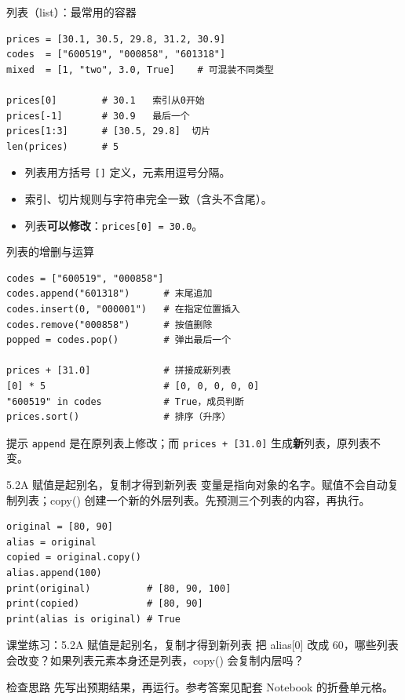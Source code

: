 \documentclass[9pt]{ctexbeamer}
\begin{document}
\begin{frame}[fragile]{列表（list）：最常用的容器}
	\begin{lstlisting}
prices = [30.1, 30.5, 29.8, 31.2, 30.9]
codes  = ["600519", "000858", "601318"]
mixed  = [1, "two", 3.0, True]    # 可混装不同类型

prices[0]        # 30.1   索引从0开始
prices[-1]       # 30.9   最后一个
prices[1:3]      # [30.5, 29.8]  切片
len(prices)      # 5
\end{lstlisting}
	\begin{itemize}
		\item 列表用方括号 \texttt{[]} 定义，元素用逗号分隔。
		\item 索引、切片规则与字符串完全一致（含头不含尾）。
		\item 列表\textbf{可以修改}：\texttt{prices[0] = 30.0}。
	\end{itemize}
\end{frame}

\begin{frame}[fragile]{列表的增删与运算}
	\begin{lstlisting}
codes = ["600519", "000858"]
codes.append("601318")      # 末尾追加
codes.insert(0, "000001")   # 在指定位置插入
codes.remove("000858")      # 按值删除
popped = codes.pop()        # 弹出最后一个

prices + [31.0]             # 拼接成新列表
[0] * 5                     # [0, 0, 0, 0, 0]
"600519" in codes           # True，成员判断
prices.sort()               # 排序（升序）
\end{lstlisting}
	\begin{exampleblock}{提示}
		\texttt{append} 是在原列表上修改；而 \texttt{prices + [31.0]} 生成\textbf{新}列表，原列表不变。
	\end{exampleblock}
\end{frame}

\begin{frame}[fragile]{5.2A 赋值是起别名，复制才得到新列表}
\small 变量是指向对象的名字。赋值不会自动复制列表；copy() 创建一个新的外层列表。先预测三个列表的内容，再执行。
\medskip
\begin{lstlisting}
original = [80, 90]
alias = original
copied = original.copy()
alias.append(100)
print(original)          # [80, 90, 100]
print(copied)            # [80, 90]
print(alias is original) # True
\end{lstlisting}
\end{frame}
\begin{frame}[fragile]{课堂练习：5.2A 赋值是起别名，复制才得到新列表}
把 alias[0] 改成 60，哪些列表会改变？如果列表元素本身还是列表，copy() 会复制内层吗？
\medskip
\begin{block}{检查思路}
先写出预期结果，再运行。参考答案见配套 Notebook 的折叠单元格。
\end{block}
\end{frame}
\end{document}
